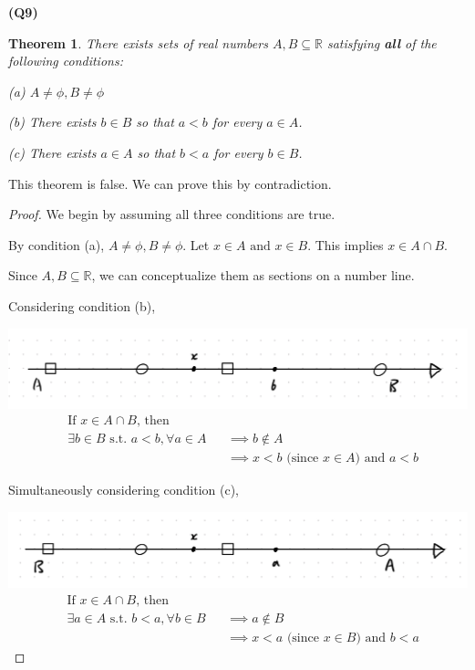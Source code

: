 \documentclass[12pt, a4paper]{article}
\newcommand{\R}{\mathbb{R}}
\newtheorem{theorem}{Theorem}
\begin{document}
\textbf{(Q9)}
\begin{theorem}
    There exists sets of real numbers $A,B \subseteq \R$ satisfying \textbf{all} of the
    following conditions:

    (a) $A \neq \phi, B \neq \phi$

    (b) There exists $b \in B$ so that $a < b$ for every $a \in A$.

    (c) There exists $a \in A$ so that $b < a$ for every $b \in B$.

\end{theorem}

This theorem is false. We can prove this by contradiction.

\begin{proof}
    We begin by assuming all three conditions are true.
    
    By condition (a), $A \neq \phi, B \neq \phi$. Let $x \in A \text{ and } x \in B$.
    This implies $x \in A \cap B$.

    Since $A, B \subseteq \R$, we can conceptualize them as sections on a number line.

    Considering condition (b),

    \includegraphics[width=\textwidth]{b_over_a.jpg}
    \begin{align*}
        &\text{If } x \in A \cap B \text{, then}\\
        &\exists b \in B \text{ s.t. } a < b, \forall a \in A && \implies b \notin A\\
        & && \implies x < b \text{ (since } x \in A \text{) and } a < b
    \end{align*}

    Simultaneously considering condition (c),

    \includegraphics[width=\textwidth]{a_over_b.jpg}
    \begin{align*}
        &\text{If } x \in A \cap B \text{, then}\\
        &\exists a \in A \text{ s.t. } b < a, \forall b \in B && \implies a \notin B\\
        & && \implies x < a \text{ (since } x \in B \text{) and } b < a
    \end{align*}


\end{proof}
\end{document}
